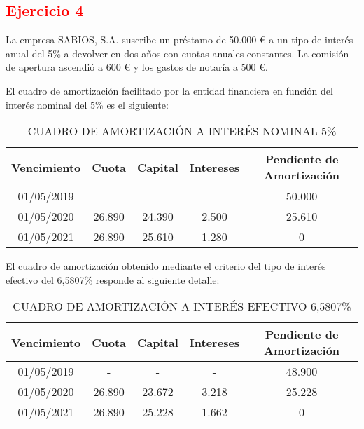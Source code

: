 \newpage
\subsection*{\textcolor{red}{Ejercicio 4}} \label{sec:otros-ejercicios_ej4}

La empresa SABIOS, S.A. suscribe un préstamo de 50.000 € a un tipo de interés anual del 5\% a devolver en dos años con cuotas anuales constantes. La comisión de apertura ascendió a 600 € y los gastos de notaría a 500 €.

El cuadro de amortización facilitado por la entidad financiera en función del interés nominal del 5\% es el siguiente:

\begin{table}[H]
\centering
\begin{tabular}{|c|c|c|c|c|}
\hline
\textbf{Vencimiento} & \textbf{Cuota} & \textbf{Capital} & \textbf{Intereses} & \textbf{Pendiente de Amortización} \\ \hline
01/05/2019 & - & - & - & 50.000 \\ \hline
01/05/2020 & 26.890 & 24.390 & 2.500 & 25.610 \\ \hline
01/05/2021 & 26.890 & 25.610 & 1.280 & 0 \\ \hline
\end{tabular}
\caption{CUADRO DE AMORTIZACIÓN A INTERÉS NOMINAL 5\%}
\end{table}

El cuadro de amortización obtenido mediante el criterio del tipo de interés efectivo del 6,5807\% responde al siguiente detalle:

\begin{table}[h!]
\centering
\begin{tabular}{|c|c|c|c|c|}
\hline
\textbf{Vencimiento} & \textbf{Cuota} & \textbf{Capital} & \textbf{Intereses} & \textbf{Pendiente de Amortización} \\ \hline
01/05/2019 & - & - & - & 48.900 \\ \hline
01/05/2020 & 26.890 & 23.672 & 3.218 & 25.228 \\ \hline
01/05/2021 & 26.890 & 25.228 & 1.662 & 0 \\ \hline
\end{tabular}
\caption{CUADRO DE AMORTIZACIÓN A INTERÉS EFECTIVO 6,5807\%}
\end{table}

